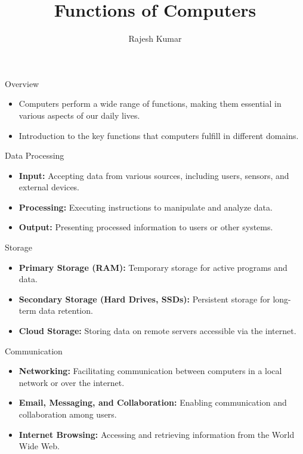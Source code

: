 \title{Functions of Computers}
\author{Rajesh Kumar}
\date{}


\begin{frame}
  \titlepage
\end{frame}

\begin{frame}{Overview}
  \begin{itemize}
    \item Computers perform a wide range of functions, making them essential in various aspects of our daily lives.
    \item Introduction to the key functions that computers fulfill in different domains.
  \end{itemize}
\end{frame}

\begin{frame}{Data Processing}
  \begin{itemize}
    \item \textbf{Input:} Accepting data from various sources, including users, sensors, and external devices.
    \item \textbf{Processing:} Executing instructions to manipulate and analyze data.
    \item \textbf{Output:} Presenting processed information to users or other systems.
  \end{itemize}
\end{frame}

\begin{frame}{Storage}
  \begin{itemize}
    \item \textbf{Primary Storage (RAM):} Temporary storage for active programs and data.
    \item \textbf{Secondary Storage (Hard Drives, SSDs):} Persistent storage for long-term data retention.
    \item \textbf{Cloud Storage:} Storing data on remote servers accessible via the internet.
  \end{itemize}
\end{frame}

\begin{frame}{Communication}
  \begin{itemize}
    \item \textbf{Networking:} Facilitating communication between computers in a local network or over the internet.
    \item \textbf{Email, Messaging, and Collaboration:} Enabling communication and collaboration among users.
    \item \textbf{Internet Browsing:} Accessing and retrieving information from the World Wide Web.
  \end{itemize}
\end{frame}

